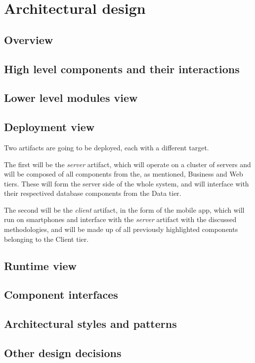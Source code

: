 \chapter{Architectural design}

\section{Overview}


\section{High level components and their interactions}


\section{Lower level modules view}


\section{Deployment view}
Two artifacts are going to be deployed, each with a different target.

The first will be the \emph{server} artifact, which will operate on a cluster of servers and will be composed of all components from the, as mentioned, Business and Web tiers. These will form the server side of the whole system, and will interface with their respectived database components from the Data tier.

The second will be the \emph{client} artifact, in the form of the \mts{} mobile app, which will run on smartphones and interface with the \emph{server} artifact with the discussed methodologies, and will be made up of all previously highlighted components belonging to the Client tier.

\section{Runtime view}


\section{Component interfaces}


\section{Architectural styles and patterns}


\section{Other design decisions}
